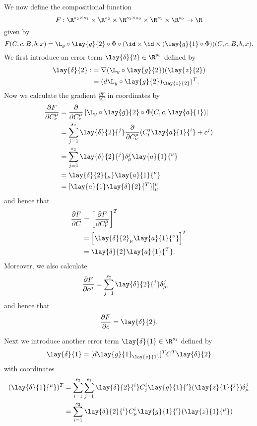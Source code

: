 We now define the compositional function
$$F:\R^{s_2\times s_1}\times \R^{s_2}\times \R^{s_1\times s_0}\times \R^{s_1}\times \R^{s_0}\to\R$$
given by
$$F(C,c,B,b,x)=\L_y\circ\lay{g}{2}\circ\Phi\circ(\id\times\id\times (\lay{g}{1}\circ\Phi))(C,c,B,b,x).$$
We first introduce an error term $\lay{\delta}{2}\in\R^{s_2}$ defined by
\begin{align*}
	\lay{\delta}{2}:&=\nabla (\L_y\circ\lay{g}{2})(\lay{z}{2})\\
	&=(d\L_y\circ\lay{g}{2})_{\lay{z}{2}})^T.
\end{align*}
Now we calculate the gradient $\frac{\partial F}{\partial C}$ in coordinates by
\begin{align*}
	\frac{\partial F}{\partial C^\mu_\nu}&=\frac{\partial}{\partial C^\mu_\nu}\left[\L_y\circ\lay{g}{2}\circ\Phi(C,c,\lay{a}{1})\right]\\
	&=\sum_{j=1}^{s_2}\lay{\delta}{2}{^j}\frac{\partial}{\partial C^\mu_\nu}(C^j_i\lay{a}{1}{^i}+c^j)\\
	&=\sum_{j=1}^{s_2}\lay{\delta}{2}{^j}\delta^j_\mu \lay{a}{1}{^\nu}\\
	&=\lay{\delta}{2}{_\mu}\lay{a}{1}{^\nu}\\
	&=[\lay{a}{1}\lay{\delta}{2}{^T}]_\mu^\nu
\end{align*}
and hence that
\begin{align*}
	\frac{\partial F}{\partial C}&=\left[
		\frac{\partial F}{\partial C^\mu_\nu}
	\right]^T\\
	&=\left[\lay{\delta}{2}_\mu \lay{a}{1}{^\nu}\right]^T\\
	&=\lay{\delta}{2}\lay{a}{1}{^T}.
\end{align*}
Moreover, we also calculate
\begin{align*}
	\frac{\partial F}{\partial c^\mu}&=\sum_{j=1}^{s_2}\lay{\delta}{2}{^j}\delta^j_\mu,
\end{align*}
and hence that
$$\frac{\partial F}{\partial c}=\lay{\delta}{2}.$$

Next we introduce another error term $\lay{\delta}{1}\in\R^{s_1}$ defined by
\begin{align*}
	\lay{\delta}{1}=[d\lay{g}{1}_{\lay{z}{1}}]^TC^T\lay{\delta}{2}
\end{align*}
with coordinates
\begin{align*}
	(\lay{\delta}{1}{^\mu})^T&=\sum_{i=1}^{s_2}\sum_{j=1}^{s_1}\lay{\delta}{2}{^i}C^i_j\lay{g}{1}{'}(\lay{z}{1}{^j})\delta^j_\mu\\
	&=\sum_{i=1}^{s_2}\lay{\delta}{2}{^i}C^i_\mu\lay{g}{1}{'}(\lay{z}{1}{^\mu})
\end{align*}

